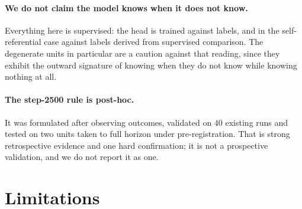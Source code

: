 \documentclass[11pt]{article}
\begin{document}
\paragraph{We do not claim the model knows when it does not know.} Everything here is supervised: the
head is trained against labels, and in the self-referential case against labels derived from
supervised comparison. The degenerate units in particular are a caution against that reading, since
they exhibit the outward signature of knowing when they do not know while knowing nothing at all.

\paragraph{The step-2500 rule is post-hoc.} It was formulated after observing outcomes, validated on
$40$ existing runs and tested on two units taken to full horizon under pre-registration. That is
strong retrospective evidence and one hard confirmation; it is not a prospective validation, and we
do not report it as one.

\section{Limitations}
\label{sec:limits}
\end{document}
